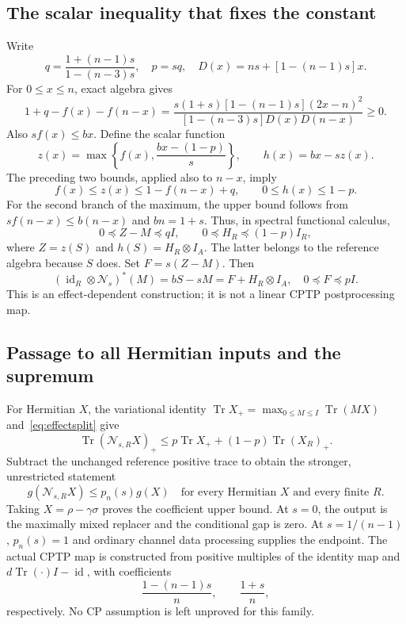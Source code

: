 \documentclass[11pt,a4paper]{article}
\newcommand{\Tr}{\operatorname{Tr}}
\newcommand{\id}{\operatorname{id}}
\newcommand{\cN}{\mathcal N}
\begin{document}
\subsection{The scalar inequality that fixes the constant}
Write
\[
 q=\frac{1+(n-1)s}{1-(n-3)s},\quad p=sq,\quad
 D(x)=ns+[1-(n-1)s]x.
\]
For $0\le x\le n$, exact algebra gives
\begin{equation}\label{eq:scalar-defect}
 1+q-f(x)-f(n-x)=
 \frac{s(1+s)[1-(n-1)s](2x-n)^2}
 {[1-(n-3)s]D(x)D(n-x)}\ge0.
\end{equation}
Also $sf(x)\le bx$. Define the scalar function
\[
 z(x)=\max\left\{f(x),\frac{bx-(1-p)}s\right\},\qquad h(x)=bx-sz(x).
\]
The preceding two bounds, applied also to $n-x$, imply
\[
 f(x)\le z(x)\le1-f(n-x)+q,\qquad0\le h(x)\le1-p.
\]
For the second branch of the maximum, the upper bound follows from
$sf(n-x)\le b(n-x)$ and $bn=1+s$. Thus, in spectral functional calculus,
\[
 0\preceq Z-M\preceq qI,\qquad
 0\preceq H_R\preceq(1-p)I_R,
\]
where $Z=z(S)$ and $h(S)=H_R\otimes I_A$. The latter belongs to the reference algebra because $S$ does. Set $F=s(Z-M)$. Then
\begin{equation}\label{eq:effectsplit}
 (\id_R\otimes\cN_s)^*(M)=bS-sM=F+H_R\otimes I_A,
 \quad0\preceq F\preceq pI.
\end{equation}
This is an effect-dependent construction; it is not a linear CPTP postprocessing map.

\subsection{Passage to all Hermitian inputs and the supremum}
For Hermitian $X$, the variational identity $\Tr X_+=\max_{0\le M\le I}\Tr(MX)$ and~\eqref{eq:effectsplit} give
\[
 \Tr(\cN_{s,R}X)_+\le p\Tr X_++(1-p)\Tr(X_R)_+.
\]
Subtract the unchanged reference positive trace to obtain the stronger, unrestricted statement
\begin{equation}\label{eq:uppergap}
 g(\cN_{s,R}X)\le p_n(s)g(X)
 \quad\text{for every Hermitian $X$ and every finite $R$.}
\end{equation}
Taking $X=\rho-\gamma\sigma$ proves the coefficient upper bound. At $s=0$, the output is the maximally mixed replacer and the conditional gap is zero. At $s=1/(n-1)$, $p_n(s)=1$ and ordinary channel data processing supplies the endpoint. The actual CPTP map is constructed from positive multiples of the identity map and $d\Tr(\cdot)I-\id$, with coefficients
\[
 \frac{1-(n-1)s}{n},\qquad\frac{1+s}{n},
\]
respectively. No CP assumption is left unproved for this family.
\end{document}

